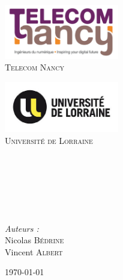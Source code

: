 \begin{titlepage}

\begin{center}

\begin{minipage}[t]{0.48\textwidth}
  \begin{flushleft}
	\includegraphics [width=50mm]{images/logo-telecom.png} \\[0.5cm]
      \textsc{\LARGE Telecom Nancy}
  \end{flushleft}
\end{minipage}
\begin{minipage}[t]{0.48\textwidth}
  \begin{flushright}
    \includegraphics [width=50mm]{images/logo-ul.jpg} \\[0.5cm]
    \textsc{\LARGE Université de Lorraine}
  \end{flushright}
\end{minipage} \\[1.5cm]


	\textsc{\Large \reportsubject}\\[0.5cm]
	\HRule \\[0.4cm]
	{\huge \bfseries \reporttitle}\\[0.4cm]
	\HRule \\[1.5cm]
	
	\begin{minipage}[t]{0.3\textwidth}
 	 	\begin{flushleft} \large
  		\end{flushleft}
	\end{minipage}
	\begin{minipage}[t]{0.6\textwidth}
  		\begin{flushright} \large
    		\emph{Auteurs :} \\
    		Nicolas \textsc{Bédrine} \\
    		Vincent \textsc{Albert} \\
  		\end{flushright}
	\end{minipage}

\vfill

{\large \today{}}

\end{center}

\end{titlepage}
